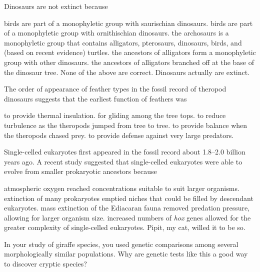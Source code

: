 
\question
Dinosaurs are not extinct because 

\begin{choices}
\correctchoice birds are part of a monophyletic group with saurischian dinosaurs. %
\choice birds are part of a monophyletic group with ornithischian dinosaurs. %
\choice the archosaurs is a monophyletic group that contains alligators, pterosaurs, dinosaurs, birds, and (based on recent evidence) turtles.   %
\choice the ancestors of alligators form a monophyletic group with other dinosaurs. %
\choice the ancestors of alligators branched off at the base of the dinosaur tree. 
\choice None of the above are correct. Dinosaurs actually are extinct.%
\end{choices}


\question
The order of appearance of feather types in the fossil record of theropod dinosaurs suggests that the earliest function of feathers was

\begin{choices}
\correctchoice to provide thermal insulation. %
\correct for gliding among the tree tops. %
\choice to reduce turbulence as the theropods jumped from tree to tree. %
\choice to provide balance when the theropods chased prey. %
\choice to provide defense against very large predators. %
\end{choices}

\question
Single-celled eukaryotes first appeared in the fossil record about 1.8--2.0 billion years ago. A recent study suggested that single-celled eukaryotes were able to evolve from smaller prokaryotic ancestors because

\begin{choices}
\correctchoice atmospheric oxygen reached concentrations suitable to suit larger organisms. %
\choice extinction of many prokaryotes emptied niches that could be filled by descendant eukaryotes. %
\choice mass extinction of the Ediacaran fauna removed predation pressure, allowing for larger organism size. %
\choice increased numbers of \textit{hox} genes allowed for the greater complexity of single-celled eukaryotes. %
\choice Pipit, my cat, willed it to be so.%
\end{choices}


\question
In your study of giraffe species, you used genetic comparisons among several morphologically similar populations. Why are genetic tests like this a good way to discover cryptic species?

